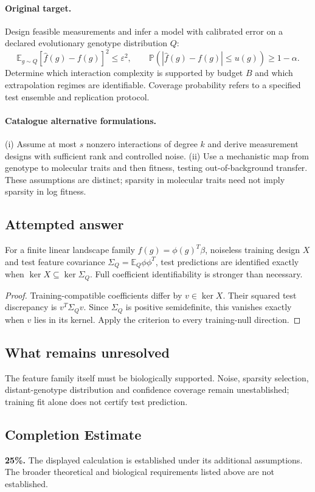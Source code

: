 \documentclass[11pt]{article}
\begin{document}
\paragraph{Original target.}
Design feasible measurements and infer a model with calibrated error on a declared evolutionary genotype distribution $Q$:
\[
\mathbb{E}_{g\sim Q}[\widehat f(g)-f(g)]^2\leq\varepsilon^2,
\qquad
\mathbb{P}(|\widehat f(g)-f(g)|\leq u(g))\geq1-\alpha.
\]
Determine which interaction complexity is supported by budget $B$ and which extrapolation regimes are identifiable. Coverage probability refers to a specified test ensemble and replication protocol.
\paragraph{Catalogue alternative formulations.}
(i) Assume at most $s$ nonzero interactions of degree $k$ and derive measurement designs with sufficient rank and controlled noise. (ii) Use a mechanistic map from genotype to molecular traits and then fitness, testing out-of-background transfer. These assumptions are distinct; sparsity in molecular traits need not imply sparsity in log fitness.
\subsection{Attempted answer}
\begin{proposition}
For a finite linear landscape family $f(g)=\phi(g)^T\beta$, noiseless training design $X$ and test feature covariance $\Sigma_Q=\mathbb{E}_Q\phi\phi^T$, test predictions are identified exactly when $\ker X\subseteq\ker\Sigma_Q$. Full coefficient identifiability is stronger than necessary.
\end{proposition}
\begin{proof}
Training-compatible coefficients differ by $v\in\ker X$. Their squared test discrepancy is $v^T\Sigma_Qv$. Since $\Sigma_Q$ is positive semidefinite, this vanishes exactly when $v$ lies in its kernel. Apply the criterion to every training-null direction.
\end{proof}
\subsection{What remains unresolved}
The feature family itself must be biologically supported. Noise, sparsity selection, distant-genotype distribution and confidence coverage remain unestablished; training fit alone does not certify test prediction.
\subsection{Completion Estimate}
\textbf{25\%.} The displayed calculation is established under its additional assumptions. The broader theoretical and biological requirements listed above are not established.
\end{document}
